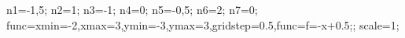 \documentclass[exercice]{thedocument}%
\begin{document}
%
    \>n1=-1,5;%
    \>n2=1;%
    \>n3=-1;%
    \>n4=0;%
    \>n5=-0,5;%
    \>n6=2;%
    \>n7=0;%
    \>func={xmin=-2,xmax=3,ymin=-3,ymax=3,gridstep=0.5,func=f=-x+0.5;};%
    \>scale=1;%
\end{document}
